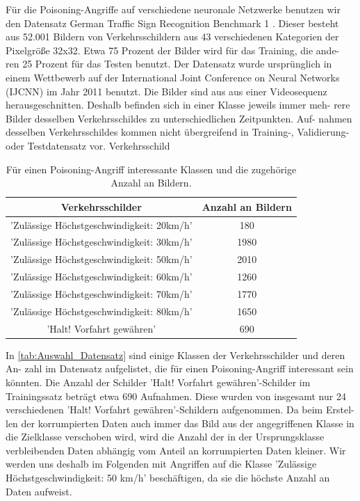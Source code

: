 \documentclass[11pt,a4paper]{article}
\numberwithin{equation}{section}
\begin{document}
	Für die Poisoning-Angriffe auf verschiedene neuronale Netzwerke benutzen wir
	den Datensatz German Traffic Sign Recognition Benchmark 1 . Dieser besteht
	aus 52.001 Bildern von Verkehrsschildern aus 43 verschiedenen Kategorien der
	Pixelgröße 32x32. Etwa 75 Prozent der Bilder wird für das Training, die ande-
	ren 25 Prozent für das Testen benutzt. Der Datensatz wurde ursprünglich in
	einem Wettbewerb auf der International Joint Conference on Neural Networks
	(IJCNN) im Jahr 2011 benutzt. Die Bilder sind aus aus einer Videosequenz
	herausgeschnitten. Deshalb befinden sich in einer Klasse jeweils immer meh-
	rere Bilder desselben Verkehrsschildes zu unterschiedlichen Zeitpunkten. Auf-
	nahmen desselben Verkehrsschildes kommen nicht übergreifend in Training-,
	Validierung- oder Testdatensatz vor.
	Verkehrsschild
	\begin{table}[h]
		\begin{tabular}[h]{c|c}
			Verkehrsschilder & Anzahl an Bildern \\ \hline
			’Zulässige Höchstgeschwindigkeit: 20km/h’& 180 \\
			’Zulässige Höchstgeschwindigkeit: 30km/h’ & 1980 \\
			’Zulässige Höchstgeschwindigkeit: 50km/h’	& 2010 \\
			’Zulässige Höchstgeschwindigkeit: 60km/h’	& 1260 \\
			’Zulässige Höchstgeschwindigkeit: 70km/h’	& 1770 \\
			’Zulässige Höchstgeschwindigkeit: 80km/h’	&1650 \\
			’Halt! Vorfahrt gewähren’					&	690
		\end{tabular}
		\label{tab:Auswahl_Datensatz}
		\caption{Für einen Poisoning-Angriff interessante Klassen und die zugehörige Anzahl an Bildern.}
	\end{table}
	
	
	
	
	
	
	
	
	In \autoref{tab:Auswahl_Datensatz} sind einige Klassen der Verkehrsschilder und deren An-
	zahl im Datensatz aufgelistet, die für einen Poisoning-Angriff interessant sein
	könnten. Die Anzahl der Schilder ’Halt! Vorfahrt gewähren’-Schilder im Trainingssatz beträgt etwa 690 Aufnahmen. Diese wurden von insgesamt nur 24 verschiedenen ’Halt! Vorfahrt gewähren’-Schildern aufgenommen. Da beim Erstel-
	len der korrumpierten Daten auch immer das Bild aus der angegriffenen Klasse
	in die Zielklasse verschoben wird, wird die Anzahl der in der Ursprungsklasse verbleibenden Daten abhängig vom Anteil an korrumpierten Daten kleiner.
	Wir werden uns deshalb im Folgenden mit Angriffen auf die Klasse ’Zulässige
	Höchstgeschwindigkeit: 50 km/h’ beschäftigen, da sie die höchste Anzahl an
	Daten aufweist.
	
\end{document}
